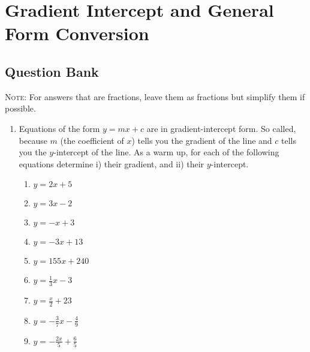 \documentclass[a4paper,12pt]{article}
\begin{document}
\large
\section*{Gradient Intercept and General Form Conversion}

\subsection*{Question Bank}

\textsc{Note}: For answers that are fractions, leave them as 
fractions but simplify them if possible.

\begin{enumerate}
\item Equations of the form $y = mx + c$ are in gradient-intercept
form. So called, because $m$ (the coefficient of $x$) tells you 
the gradient of the line and $c$ tells you the $y$-intercept of 
the line. As a warm up, for each of the following equations 
determine i) their gradient, and ii) their $y$-intercept.
    \begin{multicols}{2}
    \begin{enumerate}
    \item $y = 2x + 5$
    \item $y = 3x - 2$
    \item $y = -x + 3$
    \item $y = -3x + 13$
    \item $y = 155x + 240$
    \item $y = \frac{1}{3}x - 3$
    \item $y = \frac{x}{2} + 23$
    \item $y = -\frac{3}{7}x - \frac{4}{9}$
    \item $y = -\frac{2x}{5} + \frac{6}{5}$
    \end{enumerate}
    \end{multicols}


\end{enumerate}
\end{document}
